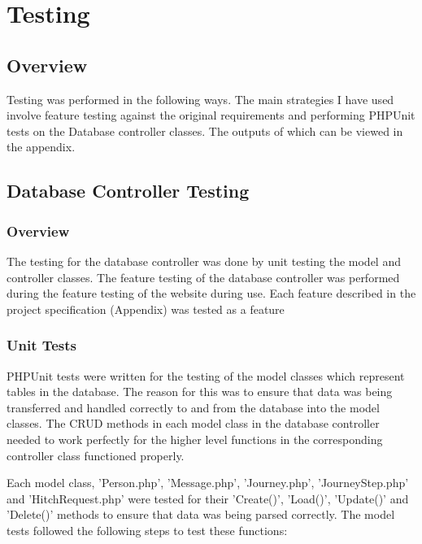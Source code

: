 \chapter{Testing}

\section{Overview}

Testing was performed in the following ways. The main strategies I have used involve feature testing against the original requirements and performing PHPUnit tests on the Database controller classes. The outputs of which can be viewed in the appendix.

\section{Database Controller Testing}
	\subsection{Overview}
		The testing for the database controller was done by unit testing the model and controller classes. The feature testing of the database controller was performed during the feature testing of the website during use. Each feature described in the project specification (Appendix) was tested as a feature

	\subsection{Unit Tests}
		PHPUnit tests were written for the testing of the model classes which represent tables in the database. The reason for this was to ensure that data was being transferred and handled correctly to and from the database into the model classes. The CRUD methods in each model class in the database controller needed to work perfectly for the higher level functions in the corresponding controller class functioned properly. 

		Each model class, 'Person.php', 'Message.php', 'Journey.php', 'Journey\textunderscore Step.php' and 'Hitch\textunderscore Request.php' were tested for their 'Create()', 'Load()', 'Update()' and 'Delete()' methods to ensure that data was being parsed correctly. The model tests followed the following steps to test these functions:

